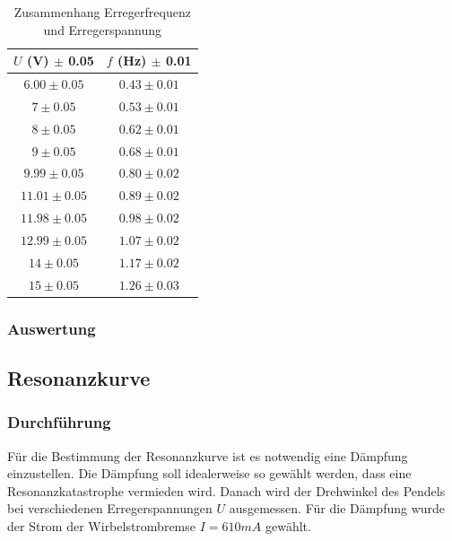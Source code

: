 \documentclass{article}
\begin{document}
\begin{table}[H]
    \centering
    \begin{tabular}{|c|c|}
    \hline
    $U$ (V) $\pm$ 0.05 & $f$ (Hz) $\pm$ 0.01 \\
    \hline
    $6.00 \pm 0.05$ & $0.43 \pm 0.01$ \\
    $7 \pm 0.05$ & $0.53 \pm 0.01$ \\
    $8 \pm 0.05$ & $0.62 \pm 0.01$ \\
    $9 \pm 0.05$ & $0.68 \pm 0.01$ \\
    $9.99 \pm 0.05$ & $0.80 \pm 0.02$ \\
    $11.01 \pm 0.05$ & $0.89 \pm 0.02$ \\
    $11.98 \pm 0.05$ & $0.98 \pm 0.02$ \\
    $12.99 \pm 0.05$ & $1.07 \pm 0.02$ \\
    $14 \pm 0.05$ & $1.17 \pm 0.02$ \\
    $15 \pm 0.05$ & $1.26 \pm 0.03$ \\
    \hline
    \end{tabular}
    \caption{Zusammenhang Erregerfrequenz und Erregerspannung}
    \label{tab:erregerfrequenz_spannung}
\end{table}

\subsubsection{Auswertung}

\subsection{Resonanzkurve}
\subsubsection{Durchführung}
Für die Bestimmung der Resonanzkurve ist es notwendig eine Dämpfung einzustellen. Die Dämpfung soll idealerweise so gewählt werden,
dass eine Resonanzkatastrophe vermieden wird. Danach wird der Drehwinkel des Pendels bei verschiedenen Erregerspannungen $U$ ausgemessen.
Für die Dämpfung wurde der Strom der Wirbelstrombremse $I = 610 mA$ gewählt.
\end{document}
